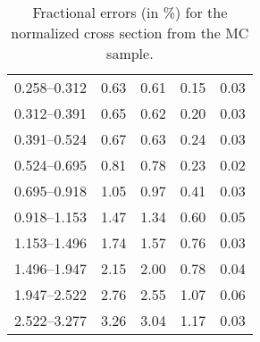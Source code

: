 \begin{table}
\begin{center}
\begin{tabular}{@{}l l l l l@{}}
            0.258--0.312 & 0.63 & 0.61 & 0.15 & 0.03  \\
            0.312--0.391 & 0.65 & 0.62 & 0.20 & 0.03  \\
            0.391--0.524 & 0.67 & 0.63 & 0.24 & 0.03  \\
            0.524--0.695 & 0.81 & 0.78 & 0.23 & 0.02  \\
            0.695--0.918 & 1.05 & 0.97 & 0.41 & 0.03  \\
            0.918--1.153 & 1.47 & 1.34 & 0.60 & 0.05  \\
            1.153--1.496 & 1.74 & 1.57 & 0.76 & 0.03  \\
            1.496--1.947 & 2.15 & 2.00 & 0.78 & 0.04  \\
            1.947--2.522 & 2.76 & 2.55 & 1.07 & 0.06  \\
            2.522--3.277 & 3.26 & 3.04 & 1.17 & 0.03  \\
            \bottomrule
        \end{tabular}
    \end{center}
    \caption{
        Fractional errors (in \%) for the normalized cross section from the
        \POWHEG MC sample.
    }
    \label{tab:powheg_uncert_norm}
\end{table}
